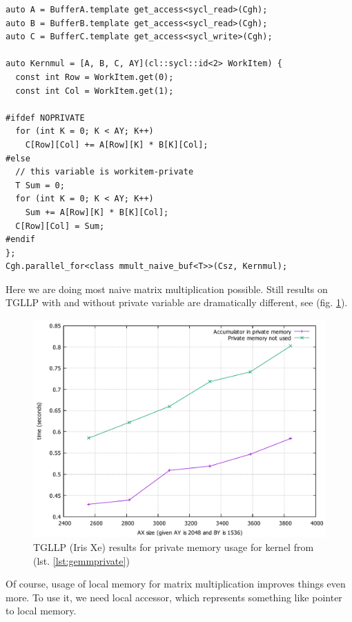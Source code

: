 \documentclass[a4paper,12pt,oneside]{article}
\begin{document}
\begin{lstlisting}[caption={Naive GEMM with private memory},label={lst:gemmprivate}]
auto A = BufferA.template get_access<sycl_read>(Cgh);
auto B = BufferB.template get_access<sycl_read>(Cgh);
auto C = BufferC.template get_access<sycl_write>(Cgh);

auto Kernmul = [A, B, C, AY](cl::sycl::id<2> WorkItem) {
  const int Row = WorkItem.get(0);
  const int Col = WorkItem.get(1);

#ifdef NOPRIVATE
  for (int K = 0; K < AY; K++)
    C[Row][Col] += A[Row][K] * B[K][Col];
#else
  // this variable is workitem-private
  T Sum = 0;
  for (int K = 0; K < AY; K++)
    Sum += A[Row][K] * B[K][Col];
  C[Row][Col] = Sum;
#endif
};
Cgh.parallel_for<class mmult_naive_buf<T>>(Csz, Kernmul);
\end{lstlisting}

Here we are doing most naive matrix multiplication possible. Still results on TGLLP with and without private variable are dramatically different, see (fig. \ref{fig:plot-priv-vs-nopriv-gemm-tgllp}).

\begin{figure}
\centering
\includegraphics[width=1.0\textwidth]{pictures/plot-priv-vs-nopriv-gemm-tgllp.pdf}
\caption{TGLLP (Iris Xe) results for private memory usage for kernel from (lst. \ref{lst:gemmprivate})}
\label{fig:plot-priv-vs-nopriv-gemm-tgllp}
\end{figure}

Of course, usage of local memory for matrix multiplication improves things even more. To use it, we need local accessor, which represents something like pointer to local memory.
\end{document}
